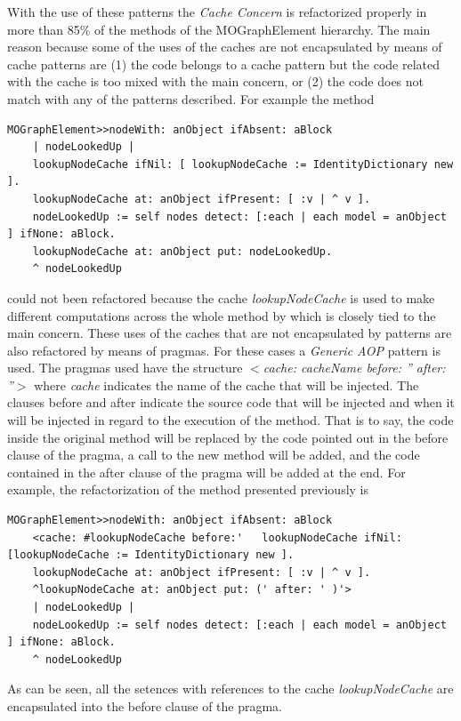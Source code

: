 \documentclass[preprint,10pt]{sigplanconf}
\begin{document}
With the use of these patterns the \emph{Cache Concern} is refactorized
properly in more than 85\% of the methods of the MOGraphElement hierarchy.
The main reason because some of the uses of the caches are not encapsulated by means of 
cache patterns are (1) the code belongs to a cache pattern but the code related with the cache is too mixed 
with the main concern, or (2) the code does not match with any of the patterns described. For example the method
\begin{lstlisting} 
MOGraphElement>>nodeWith: anObject ifAbsent: aBlock  
	| nodeLookedUp |
	lookupNodeCache ifNil: [ lookupNodeCache := IdentityDictionary new ].
	lookupNodeCache at: anObject ifPresent: [ :v | ^ v ].
	nodeLookedUp := self nodes detect: [:each | each model = anObject ] ifNone: aBlock.
	lookupNodeCache at: anObject put: nodeLookedUp.
	^ nodeLookedUp
\end{lstlisting}
could not been refactored because the cache \emph{lookupNodeCache} is used to make different computations across the whole
method by which is closely tied to the main concern. 
These uses of the caches that are not encapsulated
by patterns are also refactored by means of pragmas. For these cases
a \emph{Generic AOP} pattern is used. The pragmas used have the structure
\emph{$<$cache: cacheName before: '' after: ''$>$} where \emph{cache}
indicates the name of the cache that will be injected. The clauses
before and after indicate the source code that will be injected and
when it will be injected in regard to the execution of the method.
That is to say, the code inside the original method will be replaced
by the code pointed out in the before clause of the pragma, a call
to the new method will be added, and the code contained in the after
clause of the pragma will be added at the end. For example, the refactorization of the method presented previously is
\begin{lstlisting} 
MOGraphElement>>nodeWith: anObject ifAbsent: aBlock  
	<cache: #lookupNodeCache before:'	lookupNodeCache ifNil: [lookupNodeCache := IdentityDictionary new ]. 			
	lookupNodeCache at: anObject ifPresent: [ :v | ^ v ]. 
	^lookupNodeCache at: anObject put: (' after: ' )'>
	| nodeLookedUp |
	nodeLookedUp := self nodes detect: [:each | each model = anObject ] ifNone: aBlock.
	^ nodeLookedUp
\end{lstlisting}
As can be seen, all the setences with references to the cache  \emph{lookupNodeCache} are encapsulated into the before clause of the pragma.

\end{document}
